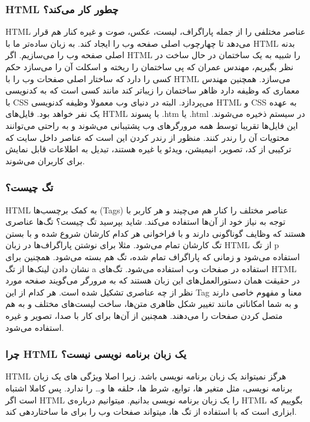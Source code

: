 \subsubsection{HTML چطور کار می‌کند؟}
HTML عناصر مختلفی را از جمله پاراگراف، لیست، عکس، صوت و غیره کنار هم قرار می‌دهد تا چهارچوب اصلی صفحه وب را ایجاد کند. به زبان ساده‌تر ما با HTML بدنه اصلی صفحه وب را می‌سازیم.
اگر HTML را شبیه به یک ساختمان در حال ساخت در نظر بگیریم، مهندس عمران که پی ساختمان را ریخته و اسکلت آن را می‌سازد حکم کسی را دارد که ساختار اصلی صفحات وب را با HTML می‌سازد. همچنین مهندس معماری که وظیفه دارد ظاهر ساختمان را زیباتر کند مانند کسی است که به کدنویسی با CSS می‌پردازد.
البته در دنیای وب معمولا وظیفه کدنویسی HTML و CSS به عهده یک نفر خواهد بود. فایل‌‌های HTML با پسوند .htm یا .html در سیستم ذخیره می‌شوند. این فایل‌ها تقریبا توسط همه مرورگرهای وب پشتیبانی می‌شوند و به راحتی می‌توانند محتویات آن را رندر کنند. منظور از رندر کردن این است که عناصر داخل سایت که ترکیبی از کد، تصویر، انیمیشن، ویدئو یا غیره هستند، تبدیل به اطلاعات قابل نمایش برای کاربران می‌شوند.

\subsubsection{تگ چیست؟}
HTML به کمک برچسب‌‌ها (Tags) عناصر مختلف را کنار هم می‌چیند و هر کاربر با توجه به نیاز خود از آن‌ها استفاده می‌کند. شاید بپرسید تگ چیست؟ تگ‌ها عناصری هستند که وظایف گوناگونی دارند و با فراخوانی هر کدام کارشان شروع شده و با بستن تگ کارشان تمام می‌شود. مثلا برای نوشتن پاراگراف‌ها در زبان HTML از تگ p استفاده می‌شود و زمانی که پاراگراف تمام شده، تگ هم بسته می‌شود. همچنین برای نشان دادن لینک‌ها از تگ a استفاده در صفحات وب استفاده می‌شود.
تگ‌های HTML در حقیقت همان دستورالعمل‌های این زبان هستند که به مرورگر می‌گویند صفحه مورد نظر از چه عناصری تشکیل شده است. هر کدام از این Tag معنا و مفهوم خاصی دارند و به شما امکاناتی مانند تغییر شکل ظاهری متن‌ها، ساخت لیست‌های مختلف و به هم متصل کردن صفحات را می‌دهند. همچنین از آن‌ها برای کار با صدا، تصویر و غیره استفاده می‌شود.

\subsubsection{چرا HTML یک زبان برنامه نویسی نیست؟}
HTML هرگز نمیتواند یک زبان برنامه نویسی باشد. زیرا اصلا ویژگی های یک زبان برنامه نویسی، مثل متغیر ها، توابع، شرط ها، حلقه ها و… را ندارد. پس کاملا اشتباه است اگر HTML را یک زبان برنامه نویسی بدانیم. میتوانیم درباره‌ی HTML بگوییم که ابزاری است که با استفاده از تگ ها، میتواند صفحات وب را برای ما ساختاردهی کند.

